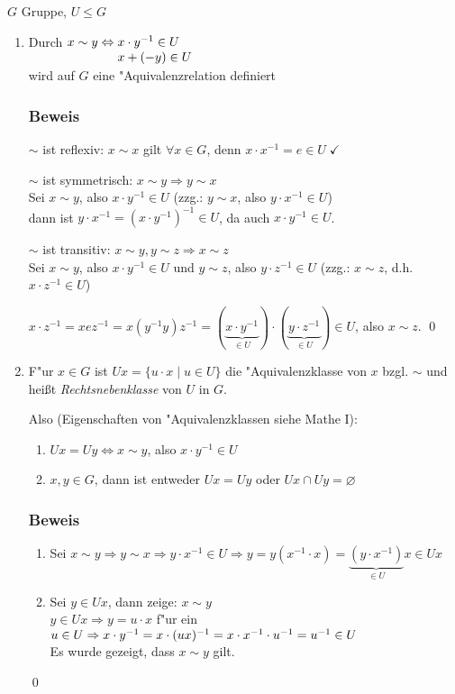 $G$ Gruppe, $U \leqslant G$
{\renewcommand{\labelenumi}{(\roman{enumi})}
\begin{enumerate}
		\item
		{Durch} $x \sim y \Leftrightarrow \mathunderset{x \cdot y^{-1} \in U}{x + (-y) \in U}$ \\
		wird auf $G$ eine "Aquivalenzrelation definiert

		\subsubsection*{Beweis}
		
		$\sim$ ist reflexiv: $x \sim x$ gilt $\forall x \in G$, denn $x \cdot x^{-1}= e \in U \; \checkmark$
		
		$\sim$ ist symmetrisch: $x \sim y \Rightarrow y \sim x$\\
		 Sei $x \sim y$, also $x \cdot y^{-1} \in U$ (zzg.: $y \sim x$, also $y \cdot x^{-1} \in U$) \\dann ist $y \cdot x^{-1} = (x \cdot y^{-1})^{-1} \in U$, da auch $ x \cdot y^{-1} \in U$.
		 
		$\sim$ ist transitiv: $x \sim y, y \sim z \Rightarrow x \sim z$\\
		Sei $x \sim y$, also $x \cdot y^{-1} \in U$ und $y \sim z$, also $y \cdot z^{-1} \in U$ (zzg.: $x \sim z$, d.h. $x\cdot z^{-1} \in U$)
		
		$x \cdot z^{-1} = xez^{-1} = x(y^{-1}y)z^{-1} = (\underbrace{x \cdot y^{-1}}_{\in U}) \cdot (\underbrace{y \cdot z^{-1}}_{\in U}) \in U$, also $x \sim z$.
		\qed
		
		
		\item
		F"ur $x \in G$ ist $Ux = \{u \cdot x \;|\; u \in U\}$ die "Aquivalenzklasse von $x$ bzgl. $\sim$ und heißt \emph{Rechtsnebenklasse} von $U$ in $G$.
		
		Also (Eigenschaften von "Aquivalenzklassen siehe Mathe I):
		\begin{enumerate}
			\item
			$Ux = Uy \Leftrightarrow x \sim y$, also $x \cdot y^{-1} \in U$
			\item
			$x,y \in G$, dann ist entweder $Ux = Uy$ oder $Ux \cap Uy = \varnothing $
		\end{enumerate}
		
		\subsubsection*{Beweis}
		\begin{enumerate}
			\item
			Sei $x \sim y \Rightarrow y \sim x \Rightarrow y \cdot x^{-1} \in U \Rightarrow y=y(x^{-1} \cdot x) = \underbrace{(y \cdot x^{-1})}_{\in U}x \in Ux$
			\item
			Sei $y \in Ux$, dann zeige: $x \sim y$ \\
			$y \in Ux \Rightarrow y = u \cdot x$ f"ur ein $u \in U\\
			\Rightarrow x \cdot y^{-1} = x \cdot (ux)^{-1} = x \cdot x^{-1} \cdot u^{-1} = u^{-1} \in U$\\
			Es wurde gezeigt, dass $x \sim y$ gilt.
		\end{enumerate} \qed


\end{enumerate}}
